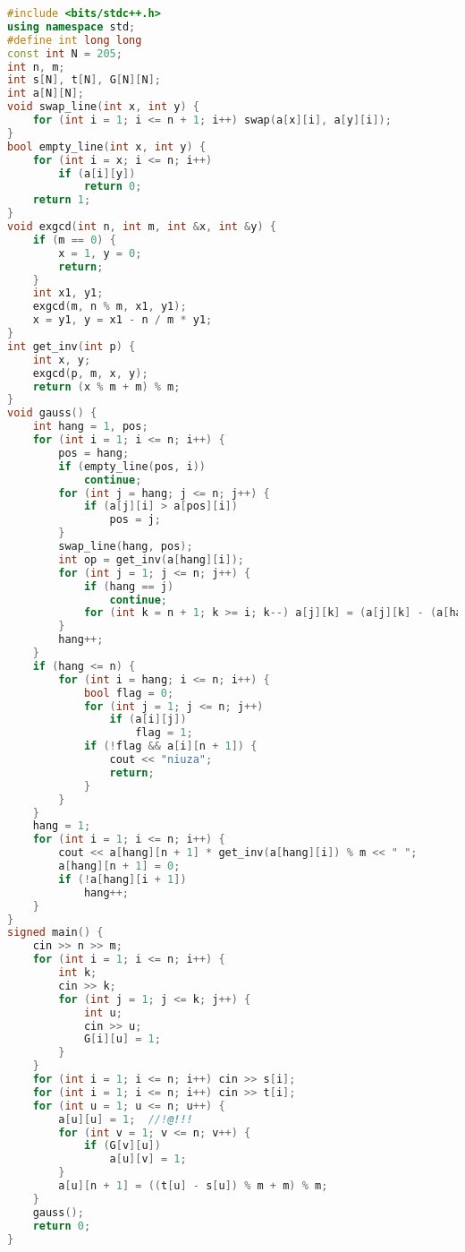\begin{lstlisting}[language=C++]
#include <bits/stdc++.h>
using namespace std;
#define int long long
const int N = 205;
int n, m;
int s[N], t[N], G[N][N];
int a[N][N];
void swap_line(int x, int y) {
    for (int i = 1; i <= n + 1; i++) swap(a[x][i], a[y][i]);
}
bool empty_line(int x, int y) {
    for (int i = x; i <= n; i++)
        if (a[i][y])
            return 0;
    return 1;
}
void exgcd(int n, int m, int &x, int &y) {
    if (m == 0) {
        x = 1, y = 0;
        return;
    }
    int x1, y1;
    exgcd(m, n % m, x1, y1);
    x = y1, y = x1 - n / m * y1;
}
int get_inv(int p) {
    int x, y;
    exgcd(p, m, x, y);
    return (x % m + m) % m;
}
void gauss() {
    int hang = 1, pos;
    for (int i = 1; i <= n; i++) {
        pos = hang;
        if (empty_line(pos, i))
            continue;
        for (int j = hang; j <= n; j++) {
            if (a[j][i] > a[pos][i])
                pos = j;
        }
        swap_line(hang, pos);
        int op = get_inv(a[hang][i]);
        for (int j = 1; j <= n; j++) {
            if (hang == j)
                continue;
            for (int k = n + 1; k >= i; k--) a[j][k] = (a[j][k] - (a[hang][k] * a[j][i] % m + m) % m * op % m + m) % m;
        }
        hang++;
    }
    if (hang <= n) {
        for (int i = hang; i <= n; i++) {
            bool flag = 0;
            for (int j = 1; j <= n; j++)
                if (a[i][j])
                    flag = 1;
            if (!flag && a[i][n + 1]) {
                cout << "niuza";
                return;
            }
        }
    }
    hang = 1;
    for (int i = 1; i <= n; i++) {
        cout << a[hang][n + 1] * get_inv(a[hang][i]) % m << " ";
        a[hang][n + 1] = 0;
        if (!a[hang][i + 1])
            hang++;
    }
}
signed main() {
    cin >> n >> m;
    for (int i = 1; i <= n; i++) {
        int k;
        cin >> k;
        for (int j = 1; j <= k; j++) {
            int u;
            cin >> u;
            G[i][u] = 1;
        }
    }
    for (int i = 1; i <= n; i++) cin >> s[i];
    for (int i = 1; i <= n; i++) cin >> t[i];
    for (int u = 1; u <= n; u++) {
        a[u][u] = 1;  //!@!!!
        for (int v = 1; v <= n; v++) {
            if (G[v][u])
                a[u][v] = 1;
        }
        a[u][n + 1] = ((t[u] - s[u]) % m + m) % m;
    }
    gauss();
    return 0;
}
\end{lstlisting}
